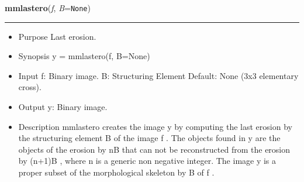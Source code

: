     \begin{boxedminipage}{\textwidth}

    \raggedright \textbf{mmlastero}(\textit{f}, \textit{B}=\texttt{N\-o\-n\-e\-})

    \vspace{-1.5ex}

    \rule{\textwidth}{0.5\fboxrule}
    \begin{itemize}
    \setlength{\parskip}{0.6ex}
      \item Purpose Last erosion.

      \item Synopsis y = mmlastero(f, B=None)

      \item Input f: Binary image. B: Structuring Element Default: None (3x3 
        elementary cross).

      \item Output y: Binary image.

      \item Description mmlastero creates the image y by computing the last 
        erosion by the structuring element B of the image f . The objects 
        found in y are the objects of the erosion by nB that can not be 
        reconstructed from the erosion by (n+1)B , where n is a generic 
        non negative integer. The image y is a proper subset of the 
        morphological skeleton by B of f .

    \end{itemize}

    \vspace{1ex}

    \end{boxedminipage}

    \label{multireg:num_pymorph:mmlblshow}
    \vspace{0.5ex}

